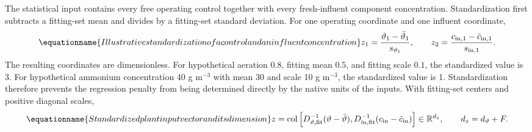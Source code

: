 The statistical input contains every free operating control together with every fresh-influent component concentration. Standardization first subtracts a fitting-set mean and divides by a fitting-set standard deviation. For one operating coordinate and one influent coordinate,
\begin{equation}
\equationname{Illustrative standardization of a control and an influent concentration}
z_1=\frac{\vartheta_1-\bar\vartheta_1}{s_{\vartheta_1}},\qquad
z_2=\frac{c_{{\rm in},1}-\bar c_{{\rm in},1}}{s_{{\rm in},1}}.
\end{equation}
The resulting coordinates are dimensionless. For hypothetical aeration $0.8$, fitting mean $0.5$, and fitting scale $0.1$, the standardized value is 3. For hypothetical ammonium concentration 40 g m$^{-3}$ with mean 30 and scale 10 g m$^{-3}$, the standardized value is 1. Standardization therefore prevents the regression penalty from being determined directly by the native units of the inputs. With fitting-set centers and positive diagonal scales,
\begin{equation}
\equationname{Standardized plant input vector and its dimension}
z=\operatorname{col}\left[D_{\vartheta,\rm fit}^{-1}(\vartheta-\bar\vartheta),
D_{{\rm in},\rm fit}^{-1}(c_{\rm in}-\bar c_{\rm in})\right]
\in\mathbb R^{d_z},\qquad d_z=d_\vartheta+F.
\label{eq:plant_standardized_input}
\end{equation}

